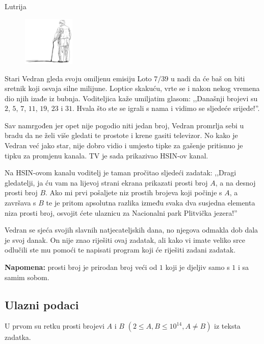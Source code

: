 \begin{statement}[
  problempoints=70,
  timelimit=2 sekunde,
  memorylimit=512 MiB,
]{Lutrija}

\setlength\intextsep{-0.1cm}
\begin{figure}
\centering
\includegraphics[width=0.22\textwidth]{img/vedran_kurdija.png}
\end{figure}

Stari Vedran gleda svoju omiljenu emisiju Loto $7/39$ u nadi da će baš on biti
sretnik koji osvaja silne milijune. Loptice skakuću, vrte se i nakon nekog
vremena dio njih izađe iz bubnja. Voditeljica kaže umiljatim glasom: ,,Današnji
brojevi su $2$, $5$, $7$, $11$, $19$, $23$ i $31$. Hvala što ste se igrali s
nama i vidimo se sljedeće srijede!''.

Sav namrgođen jer opet nije pogodio niti jedan broj, Vedran promrlja sebi u
bradu da ne želi više gledati te prostote i krene gasiti televizor. No kako je
Vedran već jako star, nije dobro vidio i umjesto tipke za gašenje pritisnuo je
tipku za promjenu kanala. TV je sada prikazivao HSIN-ov kanal.

Na HSIN-ovom kanalu voditelj je taman pročitao sljedeći zadatak: ,,Dragi
gledatelji, ja ću vam na lijevoj strani ekrana prikazati prosti broj $A$, a na
desnoj prosti broj $B$. Ako mi prvi pošaljete niz prostih brojeva koji počinje
s $A$, a završava s $B$ te je pritom apsolutna razlika između svaka dva susjedna
elementa niza prosti broj, osvojit ćete ulaznicu za Nacionalni park Plitvička
jezera!''

Vedran se sjeća svojih slavnih natjecateljskih dana, no njegova odmakla dob
dala je svoj danak. On nije znao riješiti ovaj zadatak, ali kako vi imate veliko
srce odlučili ste mu pomoći te napisati program koji će riješiti zadani zadatak.

\textbf{Napomena:} prosti broj je prirodan broj veći od $1$ koji je djeljiv samo
s $1$ i sa samim sobom.


\subsection*{Ulazni podaci}
U prvom su retku prosti brojevi $A$ i $B$ $(2 \le A, B \le 10^{14}, A \ne B)$ iz teksta
zadatka.


\end{statement}
